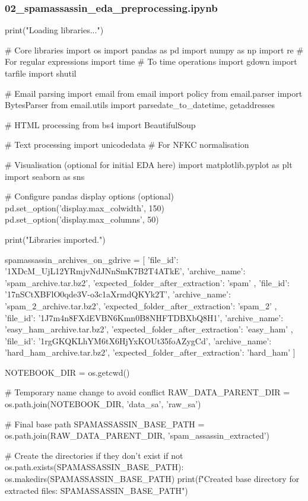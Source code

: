 \subsubsection*{02\_spamassassin\_eda\_preprocessing.ipynb}

\begin{ffcode}
print("Loading libraries...")

# Core libraries
import os
import pandas as pd
import numpy as np
import re # For regular expressions
import time # To time operations
import gdown
import tarfile
import shutil

# Email parsing
import email
from email import policy
from email.parser import BytesParser
from email.utils import parsedate_to_datetime, getaddresses

# HTML processing
from bs4 import BeautifulSoup

# Text processing
import unicodedata # For NFKC normalisation

# Visualisation (optional for initial EDA here)
import matplotlib.pyplot as plt
import seaborn as sns

# Configure pandas display options (optional)
pd.set_option('display.max_colwidth', 150)
pd.set_option('display.max_columns', 50)

print("Libraries imported.")

spamassassin_archives_on_gdrive = [
    {
        'file_id': '1XDcM_UjL12YRmjvNdJNnSmK7B2T4ATkE',
        'archive_name': 'spam_archive.tar.bz2',
        'expected_folder_after_extraction': 'spam'
    },
    {
        'file_id': '17nSCtXBFlO0qde3V-o3c1aXrmdQKYk2T',
        'archive_name': 'spam_2_archive.tar.bz2',
        'expected_folder_after_extraction': 'spam_2'
    },
    {
        'file_id': '1J7m4n8FXdEVBN6Kmn0B8NHFTDBXbQ8H1',
        'archive_name': 'easy_ham_archive.tar.bz2',
        'expected_folder_after_extraction': 'easy_ham'
    },
    {
        'file_id': '1rgGKQKLhYM6tX6HjYxKOUt35foAZygCd',
        'archive_name': 'hard_ham_archive.tar.bz2',
        'expected_folder_after_extraction': 'hard_ham'
    }
]

NOTEBOOK_DIR = os.getcwd()

# Temporary name change to avoid conflict
RAW_DATA_PARENT_DIR = os.path.join(NOTEBOOK_DIR, 'data_sa', 'raw_sa')

# Final base path
SPAMASSASSIN_BASE_PATH = os.path.join(RAW_DATA_PARENT_DIR, 'spam_assassin_extracted')

# Create the directories if they don't exist
if not os.path.exists(SPAMASSASSIN_BASE_PATH):
    os.makedirs(SPAMASSASSIN_BASE_PATH)
    print(f"Created base directory for extracted files: {SPAMASSASSIN_BASE_PATH}")


\end{ffcode}
